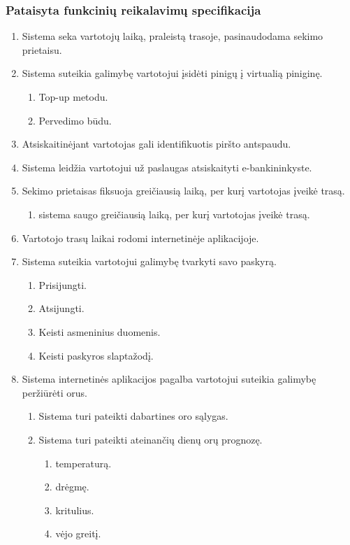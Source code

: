 \documentclass[oneside]{VUMIFPSkursinis}
\begin{document}
\subsubsection{Pataisyta funkcinių reikalavimų specifikacija}
\begin{enumerate}
	\item Sistema seka vartotojų laiką, praleistą trasoje, pasinaudodama sekimo prietaisu.
	\item Sistema suteikia galimybę vartotojui įsidėti pinigų į virtualią piniginę.
	\begin{enumerate}
		\item Top-up metodu.
		\item Pervedimo būdu.
	\end{enumerate}
	\item Atsiskaitinėjant vartotojas gali identifikuotis piršto antspaudu.
	\item Sistema leidžia vartotojui už paslaugas atsiskaityti e-bankininkyste.
	\item Sekimo prietaisas fiksuoja greičiausią laiką, per kurį vartotojas įveikė trasą.
	\begin{enumerate}
		\item sistema saugo greičiausią laiką, per kurį vartotojas įveikė trasą.
	\end{enumerate}
	\item Vartotojo trasų laikai rodomi internetinėje aplikacijoje.
	\item Sistema suteikia vartotojui galimybę tvarkyti savo paskyrą.
	\begin{enumerate}
		\item Prisijungti.
		\item Atsijungti.
		\item Keisti asmeninius duomenis.
		\item Keisti paskyros slaptažodį.
	\end{enumerate}
	\item Sistema internetinės aplikacijos pagalba vartotojui suteikia galimybę peržiūrėti orus.
	\begin{enumerate}
		\item Sistema turi pateikti dabartines oro sąlygas.
		\item Sistema turi pateikti ateinančių dienų orų prognozę.
		\begin{enumerate}
			\item temperaturą.
			\item drėgmę.
			\item kritulius.
			\item vėjo greitį.

\end{enumerate}
\end{enumerate}
\end{enumerate}
\end{document}

